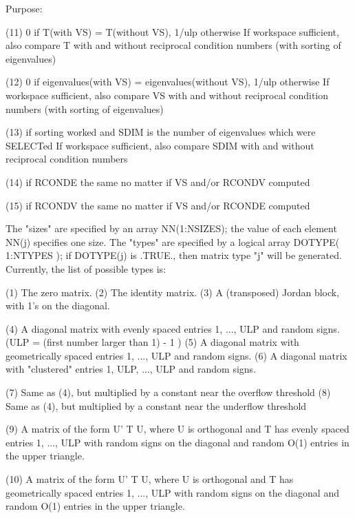 \begin{DoxyParagraph}{Purpose\+: }
\begin{DoxyVerb}
    (11)    0     if T(with VS) = T(without VS),
            1/ulp otherwise
            If workspace sufficient, also compare T with and without
            reciprocal condition numbers
            (with sorting of eigenvalues)

    (12)    0     if eigenvalues(with VS) = eigenvalues(without VS),
            1/ulp otherwise
            If workspace sufficient, also compare VS with and without
            reciprocal condition numbers
            (with sorting of eigenvalues)

    (13)    if sorting worked and SDIM is the number of
            eigenvalues which were SELECTed
            If workspace sufficient, also compare SDIM with and
            without reciprocal condition numbers

    (14)    if RCONDE the same no matter if VS and/or RCONDV computed

    (15)    if RCONDV the same no matter if VS and/or RCONDE computed

    The "sizes" are specified by an array NN(1:NSIZES); the value of
    each element NN(j) specifies one size.
    The "types" are specified by a logical array DOTYPE( 1:NTYPES );
    if DOTYPE(j) is .TRUE., then matrix type "j" will be generated.
    Currently, the list of possible types is:

    (1)  The zero matrix.
    (2)  The identity matrix.
    (3)  A (transposed) Jordan block, with 1's on the diagonal.

    (4)  A diagonal matrix with evenly spaced entries
         1, ..., ULP  and random signs.
         (ULP = (first number larger than 1) - 1 )
    (5)  A diagonal matrix with geometrically spaced entries
         1, ..., ULP  and random signs.
    (6)  A diagonal matrix with "clustered" entries 1, ULP, ..., ULP
         and random signs.

    (7)  Same as (4), but multiplied by a constant near
         the overflow threshold
    (8)  Same as (4), but multiplied by a constant near
         the underflow threshold

    (9)  A matrix of the form  U' T U, where U is orthogonal and
         T has evenly spaced entries 1, ..., ULP with random signs
         on the diagonal and random O(1) entries in the upper
         triangle.

    (10) A matrix of the form  U' T U, where U is orthogonal and
         T has geometrically spaced entries 1, ..., ULP with random
         signs on the diagonal and random O(1) entries in the upper
         triangle.


\end{DoxyVerb}
\end{DoxyParagraph}
